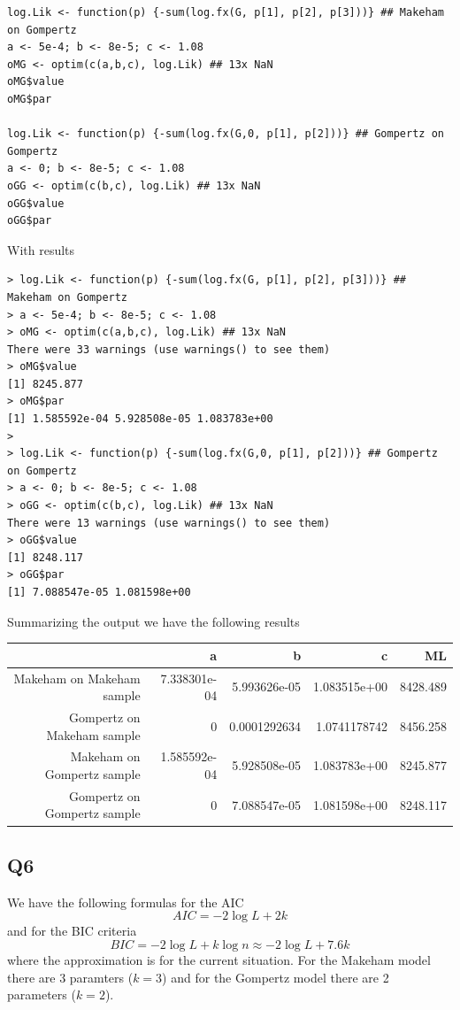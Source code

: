\documentclass[11pt]{article}
\begin{document}
\begin{verbatim}
log.Lik <- function(p) {-sum(log.fx(G, p[1], p[2], p[3]))} ## Makeham on Gompertz
a <- 5e-4; b <- 8e-5; c <- 1.08
oMG <- optim(c(a,b,c), log.Lik) ## 13x NaN
oMG$value
oMG$par

log.Lik <- function(p) {-sum(log.fx(G,0, p[1], p[2]))} ## Gompertz on Gompertz
a <- 0; b <- 8e-5; c <- 1.08
oGG <- optim(c(b,c), log.Lik) ## 13x NaN
oGG$value
oGG$par
\end{verbatim}

With results 

\begin{verbatim}
> log.Lik <- function(p) {-sum(log.fx(G, p[1], p[2], p[3]))} ## Makeham on Gompertz
> a <- 5e-4; b <- 8e-5; c <- 1.08
> oMG <- optim(c(a,b,c), log.Lik) ## 13x NaN
There were 33 warnings (use warnings() to see them)
> oMG$value
[1] 8245.877
> oMG$par
[1] 1.585592e-04 5.928508e-05 1.083783e+00
> 
> log.Lik <- function(p) {-sum(log.fx(G,0, p[1], p[2]))} ## Gompertz on Gompertz
> a <- 0; b <- 8e-5; c <- 1.08
> oGG <- optim(c(b,c), log.Lik) ## 13x NaN
There were 13 warnings (use warnings() to see them)
> oGG$value
[1] 8248.117
> oGG$par
[1] 7.088547e-05 1.081598e+00
\end{verbatim}

Summarizing the output we have the following results 

\begin{center}

\begin{tabular}{r | r | r | r | r}
 							 & a & b & c & ML \\ \hline
 Makeham on Makeham sample 	 & 7.338301e-04 & 5.993626e-05 & 1.083515e+00 & 8428.489 \\
 Gompertz on Makeham sample  & 0 & 0.0001292634 & 1.0741178742 & 8456.258 \\
 Makeham on Gompertz sample  & 1.585592e-04 & 5.928508e-05 & 1.083783e+00 & 8245.877 \\
 Gompertz on Gompertz sample & 0 & 7.088547e-05 & 1.081598e+00 & 8248.117 
 
\end{tabular}

\end{center}

\subsection*{Q6}

We have the following formulas for the AIC
\begin{equation}
AIC = -2 \log L + 2k
\end{equation}
and for the BIC criteria 
\begin{equation}
BIC = -2 \log L + k \log n \approx -2 \log L + 7.6k
\end{equation}
where the approximation is for the current situation. For the Makeham model there are 3 paramters ($k = 3$) and for the Gompertz model there are 2 parameters ($k=2$).
\end{document}
